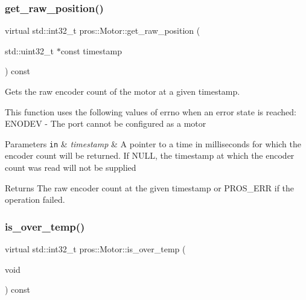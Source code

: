 \subsubsection{\texorpdfstring{get\+\_\+raw\+\_\+position()}{get\_raw\_position()}}
{\footnotesize\ttfamily virtual std\+::int32\+\_\+t pros\+::\+Motor\+::get\+\_\+raw\+\_\+position (\begin{DoxyParamCaption}\item[{std\+::uint32\+\_\+t $\ast$const}]{timestamp }\end{DoxyParamCaption}) const\hspace{0.3cm}{\ttfamily [virtual]}}



Gets the raw encoder count of the motor at a given timestamp. 

This function uses the following values of errno when an error state is reached\+: E\+N\+O\+D\+EV -\/ The port cannot be configured as a motor


\begin{DoxyParams}[1]{Parameters}
\mbox{\tt in}  & {\em timestamp} & A pointer to a time in milliseconds for which the encoder count will be returned. If N\+U\+LL, the timestamp at which the encoder count was read will not be supplied\\
\hline
\end{DoxyParams}
\begin{DoxyReturn}{Returns}
The raw encoder count at the given timestamp or P\+R\+O\+S\+\_\+\+E\+RR if the operation failed. 
\end{DoxyReturn}
\mbox{\label{classpros_1_1Motor_a099d50ed35d73fa29a46b2beb151ce2b}} 
\subsubsection{\texorpdfstring{is\+\_\+over\+\_\+temp()}{is\_over\_temp()}}
{\footnotesize\ttfamily virtual std\+::int32\+\_\+t pros\+::\+Motor\+::is\+\_\+over\+\_\+temp (\begin{DoxyParamCaption}\item[{void}]{ }\end{DoxyParamCaption}) const\hspace{0.3cm}{\ttfamily [virtual]}}



